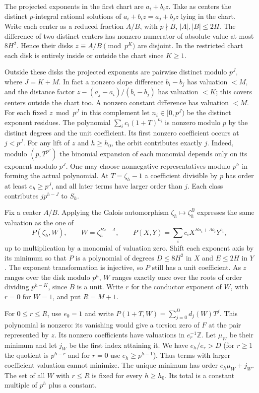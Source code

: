 The projected exponents in the first chart are $a_i+b_i z$. Take as
centers the distinct $p$-integral rational solutions of
$a_i+b_i z=a_j+b_j z$ lying in the chart. Write each center as a
reduced fraction $A/B$, with $p\nmid B$, $|A|,|B|\le2H$. The
difference of two distinct centers has nonzero numerator of absolute
value at most $8H^2$. Hence their disks $z\equiv A/B\pmod{p^K}$
are disjoint. In the restricted chart each disk is entirely inside
or outside the chart since $K\ge1$.

Outside these disks the projected exponents are pairwise distinct
modulo $p^J$, where $J=K+M$. In fact a nonzero slope difference
$b_i-b_j$ has valuation $<M$, and the distance factor
$z-(a_j-a_i)/(b_i-b_j)$ has valuation $<K$; this covers centers
outside the chart too. A nonzero constant difference has valuation
$<M$. For each fixed $z\bmod p^J$ in this complement let
$n_i\in[0,p^J)$ be the distinct exponent residues. The polynomial
$\sum_i c_i(1+T)^{n_i}$ is nonzero modulo $p$ by the distinct
degrees and the unit coefficient. Its first nonzero coefficient
occurs at $j<p^J$. For any lift of $z$ and $h\ge h_0$, the orbit
contributes exactly $j$. Indeed, modulo $(p,T^{p^J})$ the binomial
expansion of each monomial depends only on its exponent modulo $p^J$.
One may choose nonnegative representatives modulo $p^h$ in forming
the actual polynomial. At $T=\zeta_h-1$ a coefficient divisible
by $p$ has order at least $e_h\ge p^J$, and all later terms have
larger order than $j$. Each class contributes $j p^{h-J}$ to $S_h$.

Fix a center $A/B$. Applying the Galois automorphism
$\zeta_h\mapsto\zeta_h^B$ expresses the same valuation as the one of
\[
 P(\zeta_h,W),\qquad
 W=\zeta_h^{Bz-A},\qquad
 P(X,Y)=\sum_i c_i X^{B a_i+A b_i}Y^{b_i},
\]
up to multiplication by a monomial of valuation zero. Shift each
exponent axis by its minimum so that $P$ is a polynomial of degrees
$D\le8H^2$ in $X$ and $E\le2H$ in $Y$. The exponent transformation
is injective, so $P$ still has a unit coefficient. As $z$ ranges over
the disk modulo $p^h$, $W$ ranges exactly once over the roots of
order dividing $p^{h-K}$, since $B$ is a unit. Write $r$ for the
conductor exponent of $W$, with $r=0$ for $W=1$, and put $R=M+1$.

For $0\le r\le R$, use $e_0=1$ and write
$P(1+T,W)=\sum_{j=0}^{D} d_j(W)T^j$.
This polynomial is nonzero: its vanishing would give a torsion zero
of $F$ at the pair represented by $z$. Its nonzero coefficients have
valuations in $e_r^{-1}\mathbb Z$. Let $\mu_W$ be their minimum
and let $j_W$ be the first index attaining it. We have
$e_h/e_r>D$ (for $r\ge1$ the quotient is $p^{h-r}$ and for $r=0$
use $e_h\ge p^{h-1}$). Thus terms with larger coefficient valuation
cannot minimize. The unique minimum has order $e_h\mu_W+j_W$.
The set of all $W$ with $r\le R$ is fixed for every $h\ge h_0$.
Its total is a constant multiple of $p^h$ plus a constant.

